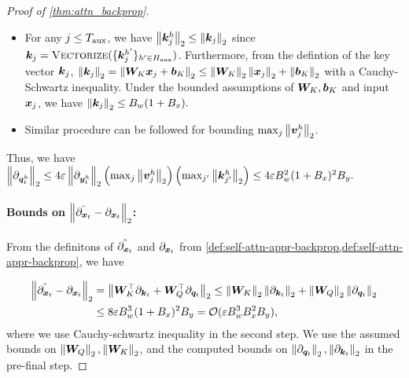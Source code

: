 \begin{proof}[Proof of \cref{thm:attn_backprop}]
\begin{itemize}
        \item For any $j \le T_{\text{aux}}$, we have $\left\| {\bm{k}}_j^{h} \right\|_2 \leq \left\| {\bm{k}}_j \right\|_2$ since ${\bm{k}}_j = \textsc{Vectorize}( \{ {\bm{k}}_j^{h'} \}_{h' \in H_{\text{aux}} } )$. Furthermore, from the defintion of the key vector ${\bm{k}}_j$, $\left\| {\bm{k}}_j \right\|_2 = \left\| {\bm{W}}_K {\bm{x}}_j + {\bm{b}}_K \right\|_2 \leq \left\|{\bm{W}}_K\right\|_2 \left\|{\bm{x}}_j\right\|_2 + \left\|{\bm{b}}_K\right\|_2$ with a Cauchy-Schwartz inequality. Under the bounded assumptions of ${\bm{W}}_K, {\bm{b}}_K$ and input ${\bm{x}}_j$, we have $\left\| {\bm{k}}_j \right\|_2 \leq B_w(1 + B_x).$

        \item Similar procedure can be followed for bounding $ \max_j \left\| {\bm{v}}_j^h \right\|_2$. 
    \end{itemize}

    Thus, we have $\left\| \partial_{ {\bm{q}}^h_t } \right\|_2 \leq 4 \varepsilon \left\| \partial_{ {\bm{y}}_t^h } \right\|_2 \left( \max_j \left\| {\bm{v}}_j^h \right\|_2 \right) \left( \max_{j'} \left\| {\bm{k}}^{h}_{j'} \right\|_2 \right) \leq 4 \varepsilon B^2_w (1 + B_x)^2 B_y.$
    

    \paragraph{Bounds on $\left\|\Hat{\partial_{{\bm{x}}_t}} - \partial_{{\bm{x}}_t}\right\|_2$:}
    From the definitons of $\Hat{\partial_{{\bm{x}}_t}}$ and $\partial_{{\bm{x}}_t}$ from \cref{def:self-attn-appr-backprop,def:self-attn-appr-backprop}, we have
    
    \begin{align*}
        \left\|\Hat{\partial_{{\bm{x}}_t}} - \partial_{{\bm{x}}_t}\right\|_2 
        &= \left\| {\bm{W}}_K^{\top} \partial_{{\bm{k}}_t} + {\bm{W}}_Q^{\top} \partial_{{\bm{q}}_t} \right\|_2 \leq \left\| {\bm{W}}_K \right\|_2 \left\| \partial_{{\bm{k}}_t} \right\|_2 +  \left\| {\bm{W}}_Q \right\|_2 \left\| \partial_{{\bm{q}}_t} \right\|_2
        \\& \leq 8 \varepsilon B^3_w (1 + B_x)^2 B_y = \mathcal{O}(  \varepsilon B^3_w  B_x^2 B_y ),
    \end{align*}
    where we use Cauchy-schwartz inequality in the second step. We use the assumed bounds on $\left\| {\bm{W}}_Q \right\|_2, \left\| {\bm{W}}_K \right\|_2$, and the computed bounds on $\left\| \partial_{{\bm{q}}_t} \right\|_2, \left\| \partial_{{\bm{k}}_t} \right\|_2$ in the pre-final step.
\end{proof}


